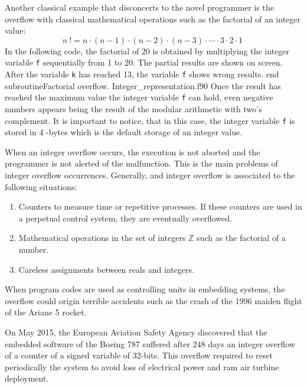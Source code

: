 Another classical example that disconcerts to the novel programmer is the overflow with classical 
mathematical operations such as the  factorial of an integer value: 
$$
 {\displaystyle n \ !=n\cdot (n-1)\cdot (n-2)\cdot (n-3)\cdot \cdots \cdot 3\cdot 2\cdot 1\ }  
$$
In the following code, 
the factorial of 20 is obtained by multiplying the integer variable \texttt{f} 
sequentially from 1 to 20. The partial results are shown on screen. After the variable \texttt{k} 
has reached 13, the variable \texttt{f} shows wrong results. 
\vspace{0.5cm}
{end subroutine}{Factorial overflow. Integer_representation.f90}
Once the result has reached the maximum value the integer variable \texttt{f} can hold, even negative 
numbers appears being the result of the modular arithmetic with two's complement. 
It is important to notice, that in this case, the integer variable \texttt{f} is stored 
in 4 -bytes which is the default storage of an integer value. 


When an integer overflow occurs, the execution is not aborted 
and the programmer is not alerted of the malfunction. 
This is the main problems of integer overflow occurrences.  
Generally, and integer overflow is associated to the following situations: 
\begin{enumerate}
\setlength\itemsep{-0.1cm}
\item Counters to measure time or repetitive processes. 
     If these counters are used in a perpetual control system, they are  eventually overflowed.
\item Mathematical operations in the set of integers $ \mathbb{Z} $ such as the factorial of a number. 
\item Careless assignments between reals and integers.
\end{enumerate}

When program codes are used as controlling units in embedding systems, 
the overflow could origin terrible accidents such as the crash of the 1996 maiden 
flight of the Ariane 5 rocket. 

On May 2015, the European Aviation Safety Agency discovered that the embedded 
software of the Boeing 787 suffered after 248 days an integer overflow  of a  counter of 
a signed variable of 32-bits. 
This overflow required to reset periodically the system to avoid 
loss of electrical power and ram air turbine deployment. 



